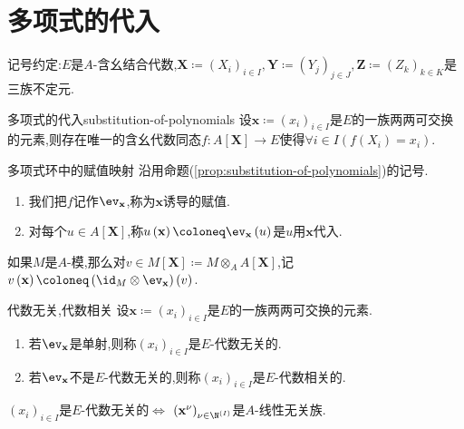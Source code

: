 \section{多项式的代入}

记号约定:$E$是$A$-含幺结合代数,$\mathbf{X}\coloneq\left(X_{i}\right)_{i\in I},\mathbf{Y}\coloneq\left(Y_{j}\right)_{j\in J},\mathbf{Z}\coloneq\left(Z_{k}\right)_{k\in K}$是三族不定元.

\begin{proposition}{多项式的代入}{substitution-of-polynomials}
	设$\mathbf{x}\coloneq\left(x_{i}\right)_{i\in I}$是$E$的一族两两可交换的元素,则存在唯一的含幺代数同态$f:A[\mathbf{X}]\to E$使得$\forall i\in I\left(f\left(X_{i}\right)=x_{i}\right)$.
\end{proposition}

\begin{definition}{多项式环中的赋值映射}{}
	沿用命题(\ref{prop:substitution-of-polynomials})的记号.
	\begin{enumerate}
		\item 我们把$f$记作$\ev_{\mathbf{x}}$,称为$\mathbf{x}$诱导的赋值.
		\item 对每个$u\in A[\mathbf{X}]$,称$u\left(\mathbf{x}\right)\coloneq\ev_{\mathbf{x}}\left(u\right)$是$u$用$\mathbf{x}$代入.
	\end{enumerate}
\end{definition}

\begin{remark}{}{}
	如果$M$是$A$-模,那么对$v\in M[\mathbf{X}]\coloneq M\otimes_{A}A[\mathbf{X}]$,记$v\left(\mathbf{x}\right)\coloneq\left(\id_{M}\otimes\ev_{\mathbf{x}}\right)\left(v\right)$.
\end{remark}

\begin{definition}{代数无关,代数相关}{}
	设$\mathbf{x}\coloneq\left(x_{i}\right)_{i\in I}$是$E$的一族两两可交换的元素.
	\begin{enumerate}
		\item 若$\ev_{\mathbf{x}}$是单射,则称$\left(x_{i}\right)_{i\in I}$是$E$-代数无关的.
		\item 若$\ev_{\mathbf{x}}$不是$E$-代数无关的,则称$\left(x_{i}\right)_{i\in I}$是$E$-代数相关的.
	\end{enumerate}
\end{definition}

\begin{remark}{}{}
	$\left(x_{i}\right)_{i\in I}$是$E$-代数无关的$\iff$ $\left(\mathbf{x}^{\nu}\right)_{\nu\in\N^{\left(I\right)}}$是$A$-线性无关族.
\end{remark}

